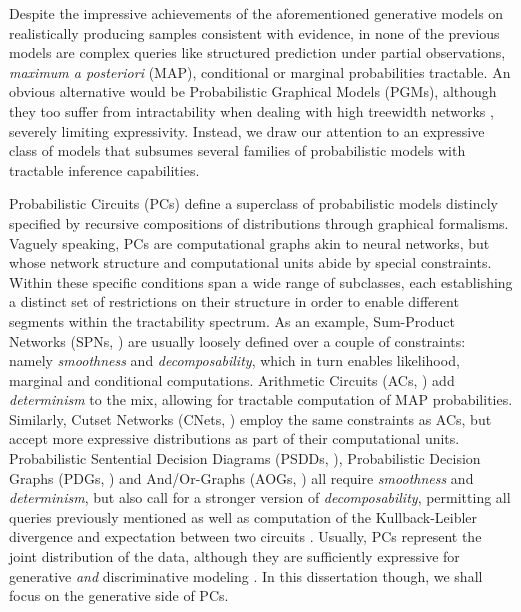Despite the impressive achievements of the aforementioned generative models on realistically
producing samples consistent with evidence, in none of the previous models are complex queries like
structured prediction under partial observations, \emph{maximum a posteriori} (MAP), conditional or
marginal probabilities tractable. An obvious alternative would be Probabilistic Graphical Models
(PGMs), although they too suffer from intractability when dealing with high treewidth networks
\citep{dechter98,koller09}, severely limiting expressivity. Instead, we draw our attention to an
expressive class of models that subsumes several families of probabilistic models with tractable
inference capabilities.

Probabilistic Circuits (PCs) define a superclass of probabilistic models distincly specified by
recursive compositions of distributions through graphical formalisms. Vaguely speaking, PCs are
computational graphs akin to neural networks, but whose network structure and computational units
abide by special constraints. Within these specific conditions span a wide range of subclasses,
each establishing a distinct set of restrictions on their structure in order to enable different
segments within the tractability spectrum. As an example, Sum-Product Networks (SPNs,
\cite{poon11}) are usually loosely defined over a couple of constraints: namely \emph{smoothness}
and \emph{decomposability}, which in turn enables likelihood, marginal and conditional
computations. Arithmetic Circuits (ACs, \cite{darwiche03}) add \emph{determinism} to the mix,
allowing for tractable computation of MAP probabilities. Similarly, Cutset Networks (CNets,
\cite{rahman14}) employ the same constraints as ACs, but accept more expressive distributions as
part of their computational units. Probabilistic Sentential Decision Diagrams (PSDDs,
\cite{kisa14}), Probabilistic Decision Graphs (PDGs, \cite{jaeger04}) and And/Or-Graphs (AOGs,
\cite{dechter07}) all require \emph{smoothness} and \emph{determinism}, but also call for a
stronger version of \emph{decomposability}, permitting all queries previously mentioned as well as
computation of the Kullback-Leibler divergence and expectation between two circuits \citep{choi20}.
Usually, PCs represent the joint distribution of the data, although they are sufficiently
expressive for generative \emph{and} discriminative modeling
\citep{khosravi19,rashwan18a,rooshenas16,gens12,shao20}. In this dissertation though, we shall
focus on the generative side of PCs.

